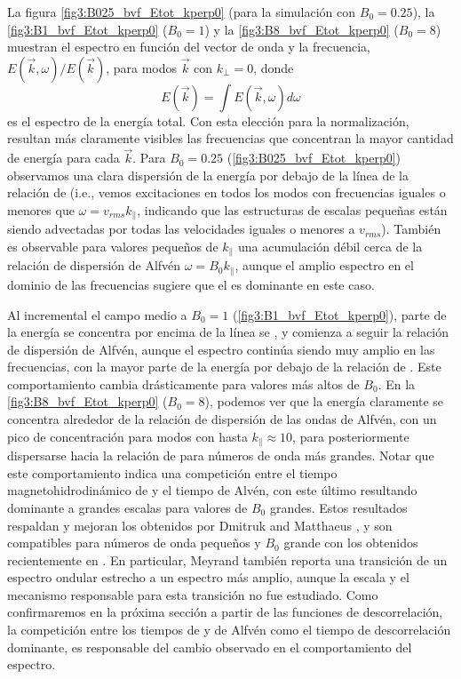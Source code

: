 La figura \cref{fig3:B025_bvf_Etot_kperp0} (para la simulación con
$B_0=0.25$), la \cref{fig3:B1_bvf_Etot_kperp0} ($B_0=1$) y la
\cref{fig3:B8_bvf_Etot_kperp0} ($B_0=8$) muestran el espectro en
función del vector de onda y la frecuencia, $E(\vec{k},
\omega)/E(\vec{k})$, para modos $\vec{k}$ con $k_\perp = 0$, donde
\begin{equation}
  E(\vec{k})=\int E(\vec{k},\omega)d\omega
\end{equation}
es el espectro de la energía total. Con esta elección para la
normalización, resultan más claramente visibles las frecuencias que
concentran la mayor cantidad de energía para cada $\vec{k}$. Para
$B_0=0.25$ (\cref{fig3:B025_bvf_Etot_kperp0}) observamos una clara
dispersión de la energía por debajo de la línea de la relación de
\sweeping (i.e., vemos excitaciones en todos los modos con frecuencias
iguales o menores que $\omega = v_{rms} k_\parallel$, indicando que
las estructuras de escalas pequeñas están siendo advectadas por todas
las velocidades iguales o menores a $v_{rms}$).  También es observable
para valores pequeños de $k_\parallel$ una acumulación débil cerca de
la relación de dispersión de Alfvén $\omega = B_0 k_\parallel$, aunque
el amplio espectro en el dominio de las frecuencias sugiere que el
\sweeping es dominante en este caso.

Al incremental el campo medio a $B_0=1$
(\cref{fig3:B1_bvf_Etot_kperp0}), parte de la energía se concentra por
encima de la línea se \sweeping, y comienza a seguir la relación de
dispersión de Alfvén, aunque el espectro continúa siendo muy amplio en
las frecuencias, con la mayor parte de la energía por debajo de la
relación de \sweeping.  Este comportamiento cambia drásticamente para
valores más altos de $B_0$.  En la \cref{fig3:B8_bvf_Etot_kperp0}
($B_0=8$), podemos ver que la energía claramente se concentra
alrededor de la relación de dispersión de las ondas de Alfvén, con un
pico de concentración para modos con hasta $k_\parallel \approx 10$,
para posteriormente dispersarse hacia la relación de \sweeping para
números de onda más grandes.  Notar que este comportamiento indica una
competición entre el tiempo magnetohidrodinámico de \sweeping y el
tiempo de Alvén, con este último resultando dominante a grandes
escalas para valores de $B_0$ grandes. Estos resultados respaldan y
mejoran los obtenidos por Dmitruk and Matthaeus
\cite{dmitruk_waves_2009}, y son compatibles para números de onda
pequeños y $B_0$ grande con los obtenidos recientemente en
\cite{meyrand_direct_2016, meyrand_weak_2015}. En particular, Meyrand
\cite{meyrand_direct_2016} también reporta una transición de un
espectro ondular estrecho a un espectro más amplio, aunque la escala y
el mecanismo responsable para esta transición no fue estudiado. Como
confirmaremos en la próxima sección a partir de las funciones de
descorrelación, la competición entre los tiempos de \sweeping y de
Alfvén como el tiempo de descorrelación dominante, es responsable del
cambio observado en el comportamiento del espectro.

